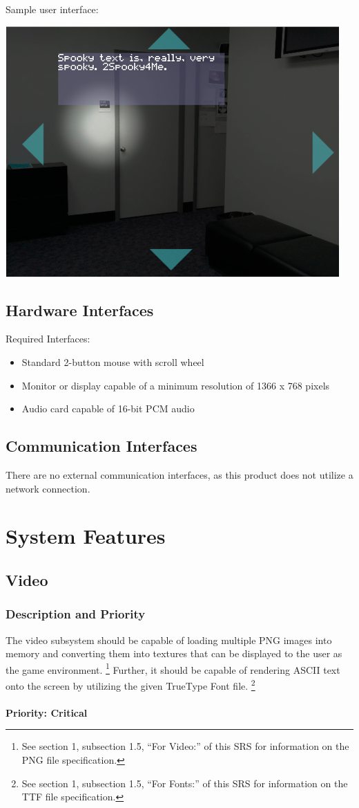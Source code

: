 \documentclass{article}
\begin{document}
		Sample user interface:\\
		\begin{center}
			\includegraphics[scale=0.75]{SampleScreen}
		\end{center}
	\subsection{Hardware Interfaces}
		Required Interfaces:
		\begin{itemize}
			\item Standard 2-button mouse with scroll wheel
			\item Monitor or display capable of a minimum resolution of 1366 x 768 pixels
			\item Audio card capable of 16-bit PCM audio
		\end{itemize}
	\subsection{Communication Interfaces}
		There are no external communication interfaces, as this product does not utilize a network connection. 
\section{System Features}
	\subsection{Video}
		\subsubsection{Description and Priority}
			The video subsystem should be capable of loading multiple PNG images into memory and converting them into textures that can be displayed to the user as the game environment.
      \footnote{See section 1, subsection 1.5, ``For Video:'' of this SRS for information on the PNG file specification.}
      Further, it should be capable of rendering ASCII text onto the screen by utilizing the given TrueType Font file.
      \footnote{See section 1, subsection 1.5, ``For Fonts:'' of this SRS for information on the TTF file specification.}\\
      \bigskip\\
			\textbf{Priority: Critical}
\end{document}
